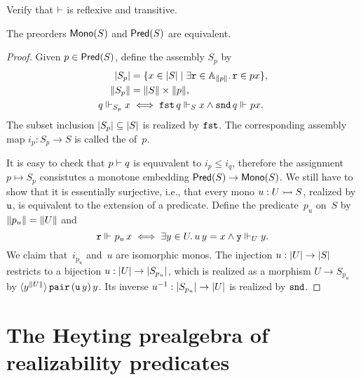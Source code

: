 \begin{exercise}
  Verify that $\entails$ is reflexive and transitive.
\end{exercise}

\begin{theorem}
  \label{thm:mono-equiv-pred}%
  The preorders $\Mono{S}$ and $\Pred{S}$ are equivalent.
\end{theorem}

\begin{proof}
  Given $p \in \Pred{S}$, define the assembly $S_p$ by
  \begin{align*}
    \S{S_p} &= \set{x \in \S{S} \such \some{\R{r} \in \Atyp{\T{p}}}{\R{r} \in p x}}, \\
    \T{S_p} &= \T{S} \times \T{p}, \\
    q \rz[S_p] x &\iff \combFst \, q \rz[S] x \land \combSnd\,q \rz p x.
  \end{align*}
  The subset inclusion $\S{S_p} \subseteq \S{S}$ is realized by $\combFst$.
  The corresponding assembly map $i_p : S_p \to S$ is called the  of~$p$.

  It is easy to check that $p \entails q$ is equuvalent to $i_p \leq i_q$, therefore the assignment $p \mapsto S_p$ consistutes a monotone embedding $\Pred{S} \to \Mono{S}$.
  We still have to show that it is essentially surjective, i.e., that every mono
  $u : U \monoto S$, realized by $\R{u}$, is equivalent to the extension of a predicate.
  Define the predicate~$p_u$ on~$S$ by $\T{p_u} = \T{U}$ and
  \begin{equation*}
    \R{r} \rz p_u \, x
    \iff
    \some{y \in U} u\,y = x \land \R{y} \rz[U] y.
  \end{equation*}
  We claim that~$i_{p_u}$ and~$u$ are isomorphic monos.
  The injection $u : \S{U} \to \S{S}$ restricts to a
  bijection $u : \S{U} \to \S{S_{p_u}}$, which is realized as a morphism $U \to
  S_{p_u}$ by
  $\tpcalam{y}{\T{U}} \combPair\,(\R{u}\,y)\,y$. Its inverse
  $\inv{u} : \S{S_{p_u}} \to \S{U}$ is realized by $\combSnd$.
\end{proof}


\section{The Heyting prealgebra of realizability predicates}
\label{sec:heyting-prealgebra}

